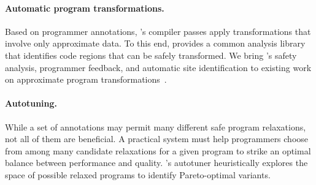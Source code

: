 \paragraph{Automatic program transformations.}
Based on programmer annotations, \sysname's compiler passes apply
transformations that involve only approximate data.
To this end,
\sysname provides a common analysis library that identifies code regions
that can be safely transformed.
We bring \sysname's safety analysis, programmer feedback, and automatic site
identification to existing work
on approximate program transformations~\cite{perforation, races-ibm,
rinard-hotpar, quickstep, dubstep, npu, anpu}.

\paragraph{Autotuning.}
While a set of annotations may permit many different safe program relaxations,
not all of them are beneficial.
A practical system must help programmers choose from
among many candidate relaxations for a given program to strike an
optimal balance between performance and quality.
\sysname's autotuner heuristically explores the space of possible relaxed
programs to identify Pareto-optimal variants.

